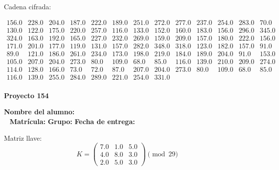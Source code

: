 \documentclass[12pt]{article}
\begin{document}
Cadena cifrada:
\begin{center}
$\begin{array}{lllllllllllll}
156.0 & 228.0 & 204.0 & 187.0 & 222.0 & 189.0 & 251.0 & 272.0 & 277.0 & 237.0 & 254.0 & 283.0 & 70.0\\
130.0 & 122.0 & 175.0 & 220.0 & 257.0 & 116.0 & 133.0 & 152.0 & 160.0 & 183.0 & 156.0 & 296.0 & 345.0\\
324.0 & 163.0 & 192.0 & 165.0 & 227.0 & 232.0 & 269.0 & 159.0 & 209.0 & 157.0 & 180.0 & 222.0 & 156.0\\
171.0 & 201.0 & 177.0 & 119.0 & 131.0 & 157.0 & 282.0 & 348.0 & 318.0 & 123.0 & 182.0 & 157.0 & 91.0\\
89.0 & 121.0 & 186.0 & 261.0 & 234.0 & 173.0 & 198.0 & 219.0 & 184.0 & 189.0 & 204.0 & 91.0 & 153.0\\
105.0 & 207.0 & 204.0 & 273.0 & 80.0 & 109.0 & 68.0 & 85.0 & 116.0 & 139.0 & 210.0 & 209.0 & 274.0\\
114.0 & 128.0 & 166.0 & 73.0 & 72.0 & 87.0 & 207.0 & 204.0 & 273.0 & 80.0 & 109.0 & 68.0 & 85.0\\
116.0 & 139.0 & 255.0 & 284.0 & 289.0 & 221.0 & 254.0 & 331.0\\
\end{array}$
\end{center}

\newpage


\textbf{Proyecto 154}

\textbf{Nombre del alumno:} \underline{\hspace{13cm}}\\\
\vspace{1cm}
\textbf{Matrícula:} \underline{\hspace{4cm}} \hspace{1cm}
\textbf{Grupo:} \underline{\hspace{2cm}}
\textbf{Fecha de entrega:} \underline{\hspace{2cm}}

\medskip

Matriz llave:
\[
K = \begin{pmatrix}
7.0 & 1.0 & 5.0\\
4.0 & 8.0 & 3.0\\
2.0 & 5.0 & 3.0
\end{pmatrix} \pmod{29}
\]
\end{document}
